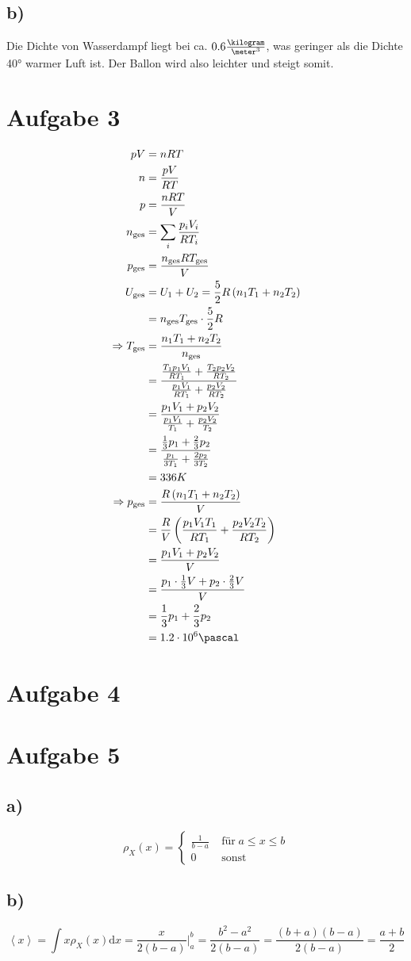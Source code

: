 \documentclass[12pt,a4paper,notitlepage]{article}
\newcommand{\diff}{\mathrm{d}}
\newcommand{\aufgabe}[1]{\section*{\setcounter{section}{#1}Aufgabe #1}}
\begin{document}
\subsection*{b)}
Die Dichte von Wasserdampf liegt bei ca. $0.6\frac{\kilogram}{\meter^3}$, was geringer als die Dichte 40° warmer Luft ist. Der Ballon wird also leichter und steigt somit.
\aufgabe{3}
\begin{align}
pV&=nRT\\
n&=\frac{pV}{RT}\\
p&=\frac{nRT}{V}\\
n_\text{ges}&=\sum_i\frac{p_iV_i}{RT_i}\\
p_\text{ges}&=\frac{n_\text{ges}RT_\text{ges}}{V}\\
U_\text{ges}&=U_1+U_2=\frac{5}{2}R\left(n_1T_1+n_2T_2\right)\\
&=n_\text{ges}T_\text{ges}\cdot\frac{5}{2}R\\
\Rightarrow T_\text{ges}&=\frac{n_1T_1+n_2T_2}{n_\text{ges}}\\
&=\frac{\frac{T_1p_1V_1}{RT_1}+\frac{T_2p_2V_2}{RT_2}}{\frac{p_1V_1}{RT_1}+\frac{p_2V_2}{RT_2}}\\
&=\frac{p_1V_1+p_2V_2}{\frac{p_1V_1}{T_1}+\frac{p_2V_2}{T_2}}\\
&=\frac{\frac{1}{3}p_1+\frac{2}{3}p_2}{\frac{p_1}{3T_1}+\frac{2p_2}{3T_2}}\\
&=336K\\
\Rightarrow p_\text{ges}&=\frac{R\left(n_1T_1+n_2T_2\right)}{V}\\
&=\frac{R}{V}\left(\frac{p_1V_1T_1}{RT_1}+\frac{p_2V_2T_2}{RT_2}\right)\\
&=\frac{p_1V_1+p_2V_2}{V}\\
&=\frac{p_1\cdot\frac{1}{3}V+p_2\cdot\frac{2}{3}V}{V}\\
&=\frac{1}{3}p_1+\frac{2}{3}p_2\\
&=1.2\cdot 10^6\pascal
\end{align}
\aufgabe{4}
\aufgabe{5}
\subsection*{a)}
\begin{equation}
\rho_X(x)=\left\{\begin{matrix}\frac{1}{b-a}&\;\text{für}\;a\leq x\leq b\\0&\;\text{sonst}\end{matrix}\right.
\end{equation}
\subsection*{b)}
\begin{equation}
\left<x\right>=\int x\rho_X(x)\diff x=\frac{x}{2(b-a)}\big|_a^b=\frac{b^2-a^2}{2(b-a)}=\frac{(b+a)(b-a)}{2(b-a)}=\frac{a+b}{2}
\end{equation}
\end{document}
